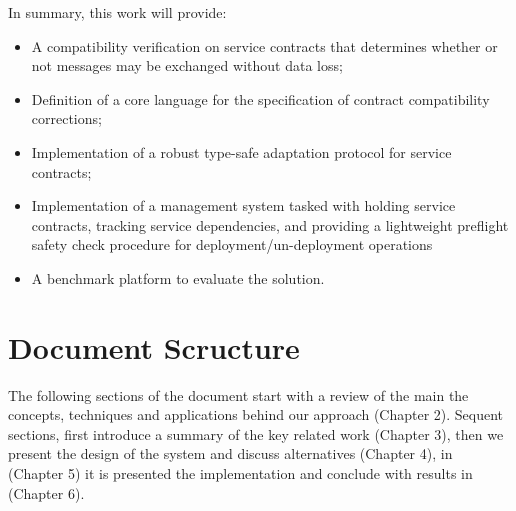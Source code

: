 In summary, this work will provide:

\begin{itemize}
    \item A compatibility verification on service contracts that determines whether or not messages may be exchanged without data loss;
    \item Definition of a core language for the specification of contract compatibility corrections;
    \item Implementation of a robust type-safe adaptation protocol for service contracts;
    \item Implementation of a management system tasked with holding service contracts, tracking service dependencies,
    and providing a lightweight preflight safety check procedure for deployment/un-deployment operations
    \item A benchmark platform to evaluate the solution.
\end{itemize}

\section{Document Scructure} %
\label{sec:document_structure}

The following sections of the document start with a review of the main the concepts,
techniques and applications behind our approach (Chapter 2).
Sequent sections, first introduce a summary of the key related work (Chapter 3), then we present the design of the system and discuss alternatives (Chapter 4),
in (Chapter 5) it is presented the implementation and conclude with results in (Chapter 6).